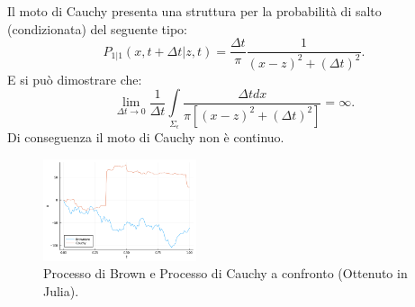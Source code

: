 \noindent
\begin{exmp}
    Il moto di Cauchy presenta una struttura per la probabilità di salto (condizionata) del seguente tipo:
    \[
	P_{1|1}(x,t+\Delta t| z , t)  = \frac{\Delta t}{\pi} \frac{1}{\left(x-z\right)^2 + \left(\Delta t\right)^2}
    .\] 
    E si può dimostrare che:
    \[
	\lim_{\Delta t \to 0} \frac{1}{\Delta t}\int\limits_{\Sigma_\epsilon}
	\frac{\Delta t dx}{\pi\left[\left(x-z\right)^2 + \left(\Delta t\right)^2\right]} = \infty
    .\] 
    Di conseguenza il moto di Cauchy non è continuo.
\end{exmp}
\noindent
\begin{figure}[H]
    \centering
    \includegraphics[width=0.4\textwidth]{figures/4_cauchy-brown.png}
    \caption{\scriptsize Processo di Brown e Processo di Cauchy a confronto (Ottenuto in Julia).}
    \label{fig:-fig}
\end{figure}


